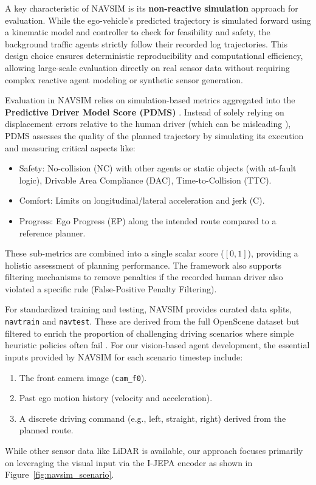 \documentclass{article}
\begin{document}
A key characteristic of NAVSIM is its \textbf{non-reactive simulation} approach for evaluation. While the ego-vehicle's predicted trajectory is simulated forward using a kinematic model and controller to check for feasibility and safety, the background traffic agents strictly follow their recorded log trajectories. This design choice ensures deterministic reproducibility and computational efficiency, allowing large-scale evaluation directly on real sensor data without requiring complex reactive agent modeling or synthetic sensor generation.

Evaluation in NAVSIM relies on simulation-based metrics aggregated into the \textbf{Predictive Driver Model Score (PDMS)} \cite{dauner2024navsim, hallgarten2023pdm}. Instead of solely relying on displacement errors relative to the human driver (which can be misleading \cite{zhairet2023rethinking}), PDMS assesses the quality of the planned trajectory by simulating its execution and measuring critical aspects like:
\begin{itemize}
    \item Safety: No-collision (NC) with other agents or static objects (with at-fault logic), Drivable Area Compliance (DAC), Time-to-Collision (TTC).
    \item Comfort: Limits on longitudinal/lateral acceleration and jerk (C).
    \item Progress: Ego Progress (EP) along the intended route compared to a reference planner.
\end{itemize}
These sub-metrics are combined into a single scalar score ($[0, 1]$), providing a holistic assessment of planning performance. The framework also supports filtering mechanisms to remove penalties if the recorded human driver also violated a specific rule (False-Positive Penalty Filtering).

For standardized training and testing, NAVSIM provides curated data splits, \texttt{navtrain} and \texttt{navtest}. These are derived from the full OpenScene dataset but filtered to enrich the proportion of challenging driving scenarios where simple heuristic policies often fail \cite{dauner2024navsim}. For our vision-based agent development, the essential inputs provided by NAVSIM for each scenario timestep include:
\begin{enumerate}
    \item The front camera image (\texttt{cam\_f0}).
    \item Past ego motion history (velocity and acceleration).
    \item A discrete driving command (e.g., left, straight, right) derived from the planned route.
\end{enumerate}
While other sensor data like LiDAR is available, our approach focuses primarily on leveraging the visual input via the I-JEPA encoder as shown in Figure~\ref{fig:navsim_scenario}. 
\end{document}
